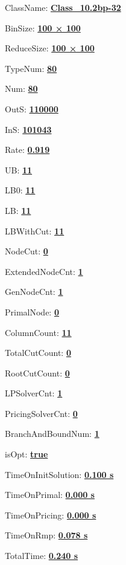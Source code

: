 \documentclass[11pt]{article}
\begin{document}
\pagestyle{empty}


ClassName: \underline{\textbf{Class_10.2bp-32}}
\par
BinSize: \underline{\textbf{100 × 100}}
\par
ReduceSize: \underline{\textbf{100 × 100}}
\par
TypeNum: \underline{\textbf{80}}
\par
Num: \underline{\textbf{80}}
\par
OutS: \underline{\textbf{110000}}
\par
InS: \underline{\textbf{101043}}
\par
Rate: \underline{\textbf{0.919}}
\par
UB: \underline{\textbf{11}}
\par
LB0: \underline{\textbf{11}}
\par
LB: \underline{\textbf{11}}
\par
LBWithCut: \underline{\textbf{11}}
\par
NodeCut: \underline{\textbf{0}}
\par
ExtendedNodeCnt: \underline{\textbf{1}}
\par
GenNodeCnt: \underline{\textbf{1}}
\par
PrimalNode: \underline{\textbf{0}}
\par
ColumnCount: \underline{\textbf{11}}
\par
TotalCutCount: \underline{\textbf{0}}
\par
RootCutCount: \underline{\textbf{0}}
\par
LPSolverCnt: \underline{\textbf{1}}
\par
PricingSolverCnt: \underline{\textbf{0}}
\par
BranchAndBoundNum: \underline{\textbf{1}}
\par
isOpt: \underline{\textbf{true}}
\par
TimeOnInitSolution: \underline{\textbf{0.100 s}}
\par
TimeOnPrimal: \underline{\textbf{0.000 s}}
\par
TimeOnPricing: \underline{\textbf{0.000 s}}
\par
TimeOnRmp: \underline{\textbf{0.078 s}}
\par
TotalTime: \underline{\textbf{0.240 s}}
\par
\newpage


\end{document}
